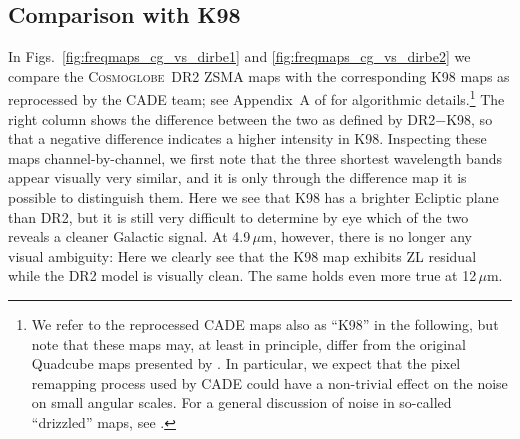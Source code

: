 \documentclass{aa}
\newcommand{\cosmoglobe}{\textsc{Cosmoglobe}}
\begin{document}




\subsection{Comparison with K98}

In Figs.~\ref{fig:freqmaps_cg_vs_dirbe1} and
\ref{fig:freqmaps_cg_vs_dirbe2} we compare the \cosmoglobe\ DR2 ZSMA
maps with the corresponding K98 maps as reprocessed by the CADE team;
see Appendix~A of \citet{paradis:2012} for algorithmic
details.\footnote{We refer to the reprocessed CADE maps also as
``K98'' in the following, but note that these maps may, at least in
principle, differ from the original Quadcube maps presented by
\citet{kelsall1998}. In particular, we expect that the pixel remapping
process used by CADE could have a non-trivial effect on the noise on
small angular scales. For a general discussion of noise in so-called
``drizzled'' maps, see \citet{Fruchter_2002}.} The right column shows
the difference between the two as defined by DR2$-$K98, so that a negative
difference indicates a higher intensity in K98. Inspecting these
maps channel-by-channel, we first note that the three shortest
wavelength bands appear visually very similar, and it is only through
the difference map it is possible to distinguish them. Here we see
that K98 has a brighter Ecliptic plane than DR2, but it is still very
difficult to determine by eye which of the two reveals a cleaner
Galactic signal. At 4.9$\,\mu$m, however, there is no longer any
visual ambiguity: Here we clearly see that the K98 map exhibits
ZL residual while the DR2 model is visually clean. The
same holds even more true at 12$\,\mu$m.
\end{document}
